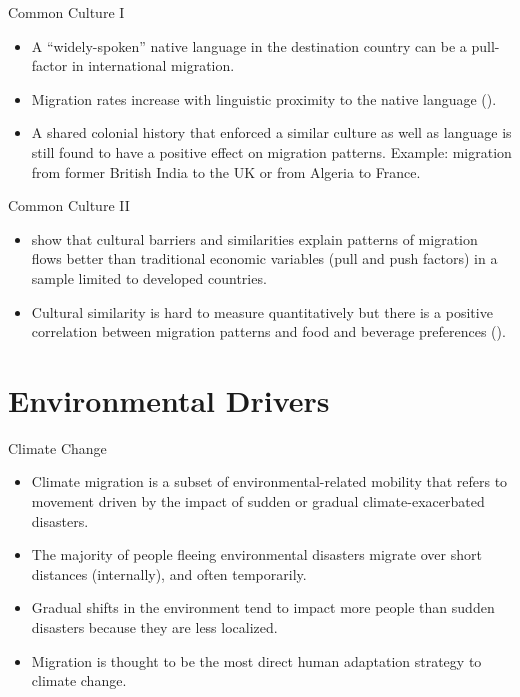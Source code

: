 \documentclass{beamer}
\begin{document}
\begin{frame}{Common Culture I}
    \begin{itemize} \small
        \item A “widely-spoken” native language in the destination country can be a pull-factor in international migration.
        \item Migration rates increase with linguistic proximity to the native language (\cite{migration_linguistic_proximity}).
        \item A shared colonial history that enforced a similar culture as well as language is still found to have a positive effect on migration patterns. Example: migration from former British India to the UK or from Algeria to France.
    \end{itemize}
\end{frame}

\begin{frame}{Common Culture II}
    \begin{itemize} \small
        \item  \textcite{dyen1992indoeuropean} show that cultural barriers and similarities explain patterns of migration flows better than traditional economic variables (pull and push factors) in a sample limited to developed countries.
        \item Cultural similarity is hard to measure quantitatively but there is a positive correlation between migration patterns and food and beverage preferences (\cite{food_preferences_and_migration}).
    \end{itemize}
\end{frame}

\section{Environmental Drivers}

\begin{frame}{Climate Change}
    \begin{itemize} \small
    \item Climate migration is a subset of environmental-related mobility that refers to movement driven by the impact of sudden or gradual climate-exacerbated disasters.
        \item The majority of people fleeing environmental disasters migrate over short distances (internally), and often temporarily. 
        \item Gradual shifts in the environment tend to impact more people than sudden disasters because they are less localized.
        \item Migration is thought to be the most direct human adaptation strategy to climate change.
    \end{itemize}
\end{frame}
\end{document}
